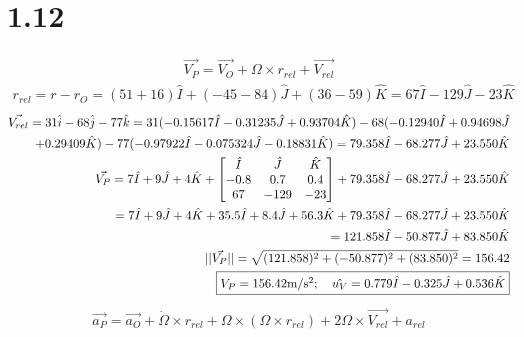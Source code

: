 \documentclass[12 pt]{article}
\begin{document}
\section*{1.12}
\begin{align*}
    \vec{V_P}=\vec{V_O}+\Omega \times r_{rel} + \vec{V_{rel}}
\end{align*}
\begin{align*}
    r_{rel}=r-r_O=(51+16)\hat{I} +(-45-84)\hat{J} + (36-59)\hat{K} = 67\hat{I} -129\hat{J}-23\hat{K}
\end{align*}
\begin{align*}
    \vec{V_{rel}}=31\hat{i} -68\hat{j}-77\hat{k}=31(-0.15617\hat{I}-0.31235\hat{J}+0.93704\hat{K})-68(-0.12940\hat{I}+0.94698\hat{J}\\
    +0.29409\hat{K})-77(-0.97922\hat{I}-0.075324\hat{J}-0.18831\hat{K})=79.358\hat{I}-68.277\hat{J}+23.550\hat{K} \\
    \vec{V_P}=7\hat{I}+9\hat{J}+4\hat{K} + \begin{bmatrix}
        \hat{I} & \hat{J} & \hat{K} \\
        -0.8 & 0.7 & 0.4 \\
        67 & -129 & -23
    \end{bmatrix} + 79.358\hat{I}-68.277\hat{J}+23.550\hat{K} \\
    = 7\hat{I}+9\hat{J}+4\hat{K} +35.5\hat{I}+8.4\hat{J}+56.3\hat{K} + 79.358\hat{I}-68.277\hat{J}+23.550\hat{K} \\
    = 121.858\hat{I} -50.877\hat{J} +83.850\hat{K} \\
    ||\vec{V_{P}}||=\sqrt{(121.858)^2+(-50.877)^2+(83.850)^2}=156.42 \\
    \fbox{$V_P=156.42 \textrm{m/s$^2$}; \quad \hat{u_V}=0.779\hat{I}-0.325\hat{J}+0.536\hat{K}$}
\end{align*}
\begin{align*}
    \vec{a_P}=\vec{a_O}+\dot{\Omega} \times r_{rel} + \Omega \times (\Omega \times r_{rel}) + 2\Omega \times \vec{V_{rel}} +a_{rel}
\end{align*}
\end{document}
